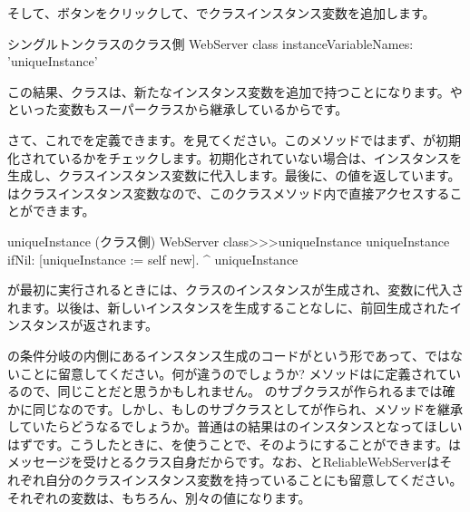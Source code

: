 \documentclass[a4paper,10pt,twoside]{book}
\begin{document}
そして、ボタンをクリックして、でクラスインスタンス変数を追加します。

\begin{classdef}[webserver]{シングルトンクラスのクラス側}
WebServer class 	
	instanceVariableNames: 'uniqueInstance'
\end{classdef}

この結果、クラスは、新たなインスタンス変数を追加で持つことになります。やといった変数もスーパークラスから継承しているからです。

さて、これでを定義できます。を見てください。このメソッドではまず、が初期化されているかをチェックします。初期化されていない場合は、インスタンスを生成し、クラスインスタンス変数に代入します。最後に、の値を返しています。はクラスインスタンス変数なので、このクラスメソッド内で直接アクセスすることができます。
    
\begin{method}[uniqueInstance]{uniqueInstance (クラス側)}
WebServer class>>>uniqueInstance
     uniqueInstance ifNil: [uniqueInstance := self new].
     ^ uniqueInstance
\end{method}

が最初に実行されるときには、クラスのインスタンスが生成され、変数に代入されます。以後は、新しいインスタンスを生成することなしに、前回生成されたインスタンスが返されます。

の条件分岐の内側にあるインスタンス生成のコードがという形であって、ではないことに留意してください。何が違うのでしょうか?
メソッドはに定義されているので、同じことだと思うかもしれません。
のサブクラスが作られるまでは確かに同じなのです。しかし、もしのサブクラスとしてが作られ、メソッドを継承していたらどうなるでしょうか。普通はの結果はのインスタンスとなってほしいはずです。こうしたときに、\self を使うことで、そのようにすることができます。\self はメッセージを受けとるクラス自身だからです。なお、と{ReliableWebServer}はそれぞれ自分のクラスインスタンス変数を持っていることにも留意してください。それぞれの変数は、もちろん、別々の値になります。
\end{document}
